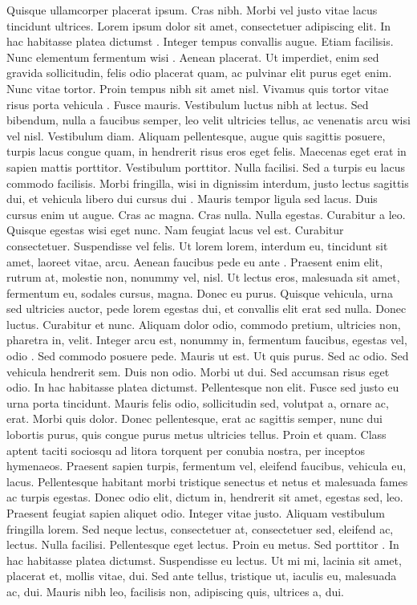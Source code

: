 Quisque ullamcorper placerat ipsum. Cras nibh. Morbi vel justo vitae lacus tincidunt ultrices.
Lorem ipsum dolor sit amet, consectetuer adipiscing elit. In hac habitasse platea dictumst \cite{Cen2014}.
Integer tempus convallis augue. Etiam facilisis. Nunc elementum fermentum wisi \cite{Fei2019}. Aenean
placerat. Ut imperdiet, enim sed gravida sollicitudin, felis odio placerat quam, ac pulvinar elit
purus eget enim. Nunc vitae tortor. Proin tempus nibh sit amet nisl. Vivamus quis tortor vitae
risus porta vehicula \cite{Neubert2020}.
Fusce mauris. Vestibulum luctus nibh at lectus. Sed bibendum, nulla a faucibus semper, leo
velit ultricies tellus, ac venenatis arcu wisi vel nisl. Vestibulum diam. Aliquam pellentesque,
augue quis sagittis posuere, turpis lacus congue quam, in hendrerit risus eros eget felis. Maecenas eget erat in sapien mattis porttitor. Vestibulum porttitor. Nulla facilisi. Sed a turpis eu
lacus commodo facilisis. Morbi fringilla, wisi in dignissim interdum, justo lectus sagittis dui,
et vehicula libero dui cursus dui \cite{Schumann2007}. Mauris tempor ligula sed lacus. Duis cursus enim ut augue.
Cras ac magna. Cras nulla. Nulla egestas. Curabitur a leo. Quisque egestas wisi eget nunc.
Nam feugiat lacus vel est. Curabitur consectetuer.
Suspendisse vel felis. Ut lorem lorem, interdum eu, tincidunt sit amet, laoreet vitae, arcu.
Aenean faucibus pede eu ante \cite{WANG2018}. Praesent enim elit, rutrum at, molestie non, nonummy vel, nisl.
Ut lectus eros, malesuada sit amet, fermentum eu, sodales cursus, magna. Donec eu purus.
Quisque vehicula, urna sed ultricies auctor, pede lorem egestas dui, et convallis elit erat sed
nulla. Donec luctus. Curabitur et nunc. Aliquam dolor odio, commodo pretium, ultricies non,
pharetra in, velit. Integer arcu est, nonummy in, fermentum faucibus, egestas vel, odio \cite{Wang1998}.
Sed commodo posuere pede. Mauris ut est. Ut quis purus. Sed ac odio. Sed vehicula
hendrerit sem. Duis non odio. Morbi ut dui. Sed accumsan risus eget odio. In hac habitasse
platea dictumst. Pellentesque non elit. Fusce sed justo eu urna porta tincidunt. Mauris felis
odio, sollicitudin sed, volutpat a, ornare ac, erat. Morbi quis dolor. Donec pellentesque, erat ac
sagittis semper, nunc dui lobortis purus, quis congue purus metus ultricies tellus. Proin et quam.
Class aptent taciti sociosqu ad litora torquent per conubia nostra, per inceptos hymenaeos.
Praesent sapien turpis, fermentum vel, eleifend faucibus, vehicula eu, lacus.
Pellentesque habitant morbi tristique senectus et netus et malesuada fames ac turpis egestas.
Donec odio elit, dictum in, hendrerit sit amet, egestas sed, leo. Praesent feugiat sapien aliquet
odio. Integer vitae justo. Aliquam vestibulum fringilla lorem. Sed neque lectus, consectetuer
at, consectetuer sed, eleifend ac, lectus. Nulla facilisi. Pellentesque eget lectus. Proin eu
metus. Sed porttitor \cite{Neubert2020}. In hac habitasse platea dictumst. Suspendisse eu lectus. Ut mi mi, lacinia
sit amet, placerat et, mollis vitae, dui. Sed ante tellus, tristique ut, iaculis eu, malesuada ac, dui.
Mauris nibh leo, facilisis non, adipiscing quis, ultrices a, dui.